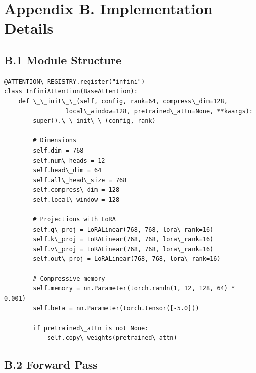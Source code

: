 
\section{Appendix B. Implementation Details}

\subsection{B.1 Module Structure}

\begin{lstlisting}
@ATTENTION\_REGISTRY.register("infini")
class InfiniAttention(BaseAttention):
    def \_\_init\_\_(self, config, rank=64, compress\_dim=128,
                 local\_window=128, pretrained\_attn=None, **kwargs):
        super().\_\_init\_\_(config, rank)
        
        # Dimensions
        self.dim = 768
        self.num\_heads = 12
        self.head\_dim = 64
        self.all\_head\_size = 768
        self.compress\_dim = 128
        self.local\_window = 128
        
        # Projections with LoRA
        self.q\_proj = LoRALinear(768, 768, lora\_rank=16)
        self.k\_proj = LoRALinear(768, 768, lora\_rank=16)
        self.v\_proj = LoRALinear(768, 768, lora\_rank=16)
        self.out\_proj = LoRALinear(768, 768, lora\_rank=16)
        
        # Compressive memory
        self.memory = nn.Parameter(torch.randn(1, 12, 128, 64) * 0.001)
        self.beta = nn.Parameter(torch.tensor([-5.0]))
        
        if pretrained\_attn is not None:
            self.copy\_weights(pretrained\_attn)
\end{lstlisting}

\subsection{B.2 Forward Pass}

